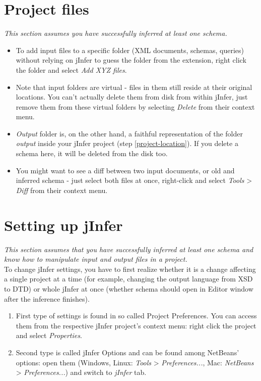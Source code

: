 \documentclass[a4paper,10pt,oneside]{article}
\begin{document}
\section{Project files}
\textit{This section assumes you have successfully inferred at least one schema.}
\begin{itemize}
	\item To add input files to a specific folder (XML documents, schemas, queries) without relying on jInfer to guess the folder from the extension, right click the folder and select \textit{Add XYZ files}.
	\item Note that input folders are virtual - files in them still reside at their original locations. You can’t actually delete them from disk from within jInfer, just remove them from these virtual folders by selecting \textit{Delete} from their context menu.
	\item \textit{Output} folder is, on the other hand, a faithful representation of the folder \textit{output} inside your jInfer project (step \ref{project-location}). If you delete a schema here, it will be deleted from the disk too.
	\item You might want to see a diff between two input documents, or old and inferred schema - just select both files at once, right-click and select \textit{Tools} > \textit{Diff} from their context menu.
\end{itemize}

\section{Setting up jInfer}
\textit{This section assumes that you have successfully inferred at least one schema and know how to manipulate input and output files in a project.}\\

To change jInfer settings, you have to first realize whether it is a change affecting a single project at a time (for example, changing the output language from XSD to DTD) or whole jInfer at once (whether schema should open in Editor window after the inference finishes).
\begin{enumerate}
	\item First type of settings is found in so called Project Preferences. You can access them from the respective jInfer project’s context menu: right click the project and select \textit{Properties}.
	\item Second type is called jInfer Options and can be found among NetBeans’ options: open them (Windows, Linux: \textit{Tools} > \textit{Preferences...}, Mac: \textit{NetBeans} > \textit{Preferences...}) and switch to \textit{jInfer} tab.
\end{enumerate}

\nocite{*}


\end{document}
